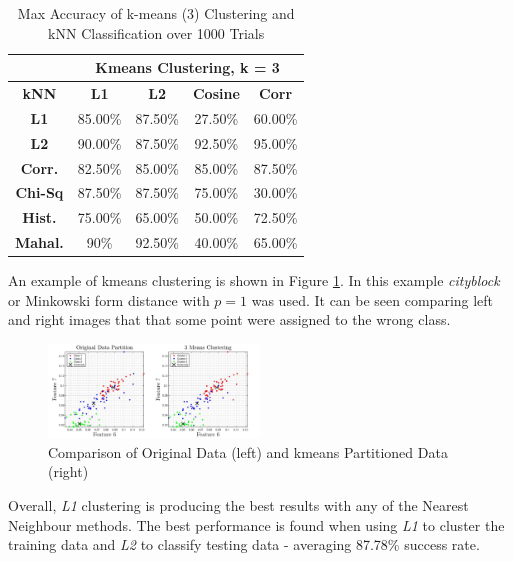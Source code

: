 \documentclass[10pt,twocolumn,letterpaper]{article}
\begin{document}
\begin{table}
\caption{Max Accuracy of k-means (3) Clustering and kNN Classification over 1000 Trials \label{tab:kmeans_3max}}
\footnotesize
\begin{center}
\begin{tabular}{|c| c c c c|}
\cline{2-5}
\multicolumn{1}{c|}{ } & \multicolumn{4}{|c|}{\bf Kmeans Clustering, k = 3} \\
\hline
\bf kNN &\bf L1 &\bf L2 &\bf Cosine &\bf Corr \\ [0.5ex]
\hline
\bf L1 & 85.00\% & 87.50\%  & 27.50\% & 60.00\%\\ [0.5ex]
\hline
\bf L2 & 90.00\% & 87.50\%  & 92.50\% & 95.00\%\\ [0.5ex]
\hline
\bf Corr. & 82.50\% & 85.00\%  & 85.00\% & 87.50\%\\ [0.5ex]
\hline
\bf Chi-Sq & 87.50\% & 87.50\%  & 75.00\% & 30.00\%\\ [0.5ex]
\hline
\bf Hist. & 75.00\% & 65.00\%  & 50.00\% & 72.50\%\\ [0.5ex]
\hline
\bf Mahal. & 90\% & 92.50\% & 40.00\% & 65.00\%\\ [0.5ex]
\hline
\end{tabular}
\end{center}
\end{table}

An example of kmeans clustering is shown in Figure \ref{fig:clusFig}. In this example \textit{cityblock} or Minkowski form distance with $p=1$ was used. It can be seen comparing left and right images that that some point were assigned to the wrong class.

\begin{figure}
\centering
\includegraphics[width=0.5\textwidth]{../results/kmeans_part}
\caption{Comparison of Original Data (left) and kmeans Partitioned Data (right)
\label{fig:clusFig}}
\end{figure}
 
Overall, \textit{L1} clustering is producing the best results with any of the Nearest Neighbour methods. The best performance is found when using \textit{L1} to cluster the training data and \textit{L2} to classify testing data - averaging 87.78\% success rate.
\end{document}
